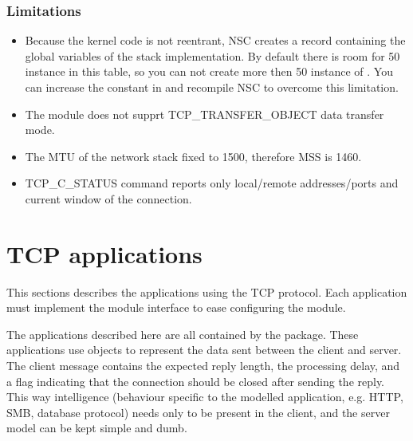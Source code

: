 \subsubsection*{Limitations}

\begin{itemize}
\item Because the kernel code is not reentrant, NSC creates a record containing
the global variables of the stack implementation. By default there is room
for 50 instance in this table, so you can not create more then 50 instance
of . You can increase the  constant
in  and recompile NSC to overcome this limitation. 

\item The  module does not supprt TCP\_TRANSFER\_OBJECT
data transfer mode.

\item The MTU of the network stack fixed to 1500, therefore MSS is 1460.

\item TCP\_C\_STATUS command reports only local/remote addresses/ports and
      current window of the connection.

\end{itemize}



\section{TCP applications}

This sections describes the applications using the TCP protocol.
Each application must implement the  module interface
to ease configuring the  module.

The applications described here are all contained by the
 package. These applications use
 objects to represent the data sent between the client
and server. The client message contains the expected reply length, the
processing delay, and a flag indicating that the connection should be closed
after sending the reply. This way intelligence (behaviour specific to the
modelled application, e.g. HTTP, SMB, database protocol) needs only to be
present in the client, and the server model can be kept simple and dumb.


